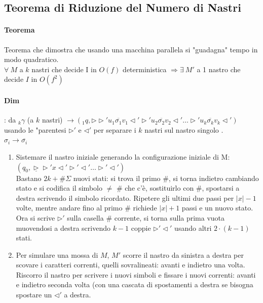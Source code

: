 \documentclass[10pt]{book}
\begin{document}
\subsection{Teorema di Riduzione del Numero di Nastri}
\paragraph{Teorema} Teorema che dimostra che usando una macchina parallela si "guadagna" tempo in modo quadratico.\\
$\forall\:M$ a $k$ nastri che decide I in $O(f)$ deterministica $\Rightarrow\exists\:M'$ a 1 nastro che decide $I$ in $O(f^2)$
\paragraph{Dim}: da $_k\gamma$ (a $k$ nastri) $\longrightarrow (_1q, \triangleright \triangleright' u_1 \overline{\sigma_1} v_1 \triangleleft' \triangleright' u_2 \overline{\sigma_2} v_2 \triangleleft'\ldots \triangleright' u_k \overline{\sigma_k} v_k \triangleleft')$ usando le "parentesi $\triangleright'$ e $\triangleleft'$ per separare i $k$ nastri sul nastro singolo .\\
$\sigma_i \longrightarrow \overline{\sigma_i}$
\begin{enumerate}
	\item Sistemare il nastro iniziale generando la configurazione iniziale di M: $(q_0,\underline{\triangleright} \triangleright' x \triangleleft' \triangleright' \triangleleft' \ldots \triangleright' \triangleleft' )$\\Bastano $2k + \#\Sigma$ nuovi stati: si trova il primo \#, si torna indietro cambiando stato e si codifica il simbolo $\neq$ \# che c'è, sostituirlo con \#, spostarsi a destra scrivendo il simbolo ricordato. Ripetere gli ultimi due passi per $|x| - 1$ volte, mentre andare fino al primo \# richiede $|x| + 1$ passi e un nuovo stato. Ora si scrive $\triangleright'$ sulla casella \# corrente, si torna sulla prima vuota muovendosi a destra scrivendo $k-1$ coppie $\triangleright'\triangleleft'$ usando altri $2\cdot(k-1)$ stati.
	\item Per simulare una mossa di $M$, $M'$ scorre il nastro da sinistra a destra per scovare i caratteri correnti, quelli sovralineati: avanti e indietro una volta.\\
	Riscorro il nastro per scrivere i nuovi simboli e fissare i nuovi correnti: avanti e indietro seconda volta (con una cascata di spostamenti a destra se bisogna spostare un $\triangleleft'$ a destra.
\end{enumerate}
\end{document}
